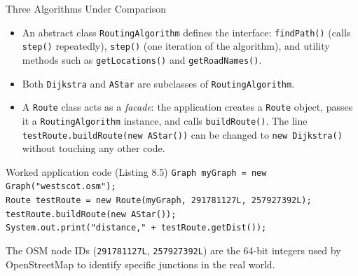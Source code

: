 \documentclass[aspectratio=169,10pt]{beamer}
\begin{document}
\begin{frame}[allowframebreaks]{Three Algorithms Under Comparison}
  \begin{itemize}
    \item An abstract class \texttt{RoutingAlgorithm} defines the
      interface: \texttt{findPath()} (calls \texttt{step()} repeatedly),
      \texttt{step()} (one iteration of the algorithm), and utility
      methods such as \texttt{getLocations()} and \texttt{getRoadNames()}.
    \item Both \texttt{Dijkstra} and \texttt{AStar} are subclasses of
      \texttt{RoutingAlgorithm}.
    \item A \texttt{Route} class acts as a \emph{facade}: the application
      creates a \texttt{Route} object, passes it a \texttt{RoutingAlgorithm}
      instance, and calls \texttt{buildRoute()}.  The line
      \texttt{testRoute.buildRoute(new AStar())} can be changed to
      \texttt{new Dijkstra()} without touching any other code.
  \end{itemize}

  \begin{exampleblock}{Worked application code (Listing 8.5)}
    \texttt{Graph myGraph = new Graph("westscot.osm");} \\
    \texttt{Route testRoute = new Route(myGraph, 291781127L, 257927392L);} \\
    \texttt{testRoute.buildRoute(new AStar());} \\
    \texttt{System.out.print("distance," + testRoute.getDist());}
  \end{exampleblock}

  The OSM node IDs (\texttt{291781127L}, \texttt{257927392L}) are the
  64-bit integers used by OpenStreetMap to identify specific junctions in
  the real world.
\end{frame}
\end{document}
